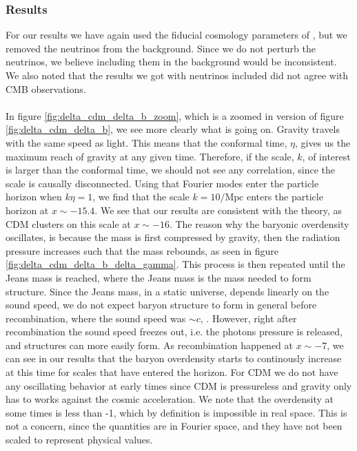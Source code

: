 \documentclass{aa}
\begin{document}
\subsubsection{Results}
For our results we have again used the fiducial cosmology parameters of \cite{winther:2023}, but we removed the neutrinos from the background.
Since we do not perturb the neutrinos, we believe including them in the background would be inconsistent. We also noted that the results we got with neutrinos included
did not agree with CMB observations.\\
\\
In figure \ref{fig:delta_cdm_delta_b_zoom}, which is a zoomed in version of figure \ref{fig:delta_cdm_delta_b}, we see more clearly what is going on. Gravity travels with the same speed as light. This means that the conformal time, $\eta$,
gives us the maximum reach of gravity at any given time. Therefore, if the scale, $k$, of interest is larger than the conformal time, we should not see any correlation,
since the scale is causally disconnected. Using that Fourier modes enter the particle horizon when $k\eta=1$, we find
that the scale $k=10/\mathrm{Mpc}$ enters the particle horizon at $x\sim -15.4$.
We see that our results are consistent with the theory, as CDM clusters on this scale at $x\sim -16$. The reason why the baryonic overdensity oscillates, is because 
the mass is first compressed by gravity, then the radiation pressure increases such that the mass rebounds, as seen in figure \ref{fig:delta_cdm_delta_b_delta_gamma}. This process is then repeated until the Jeans mass is reached, where the Jeans mass is the mass needed to form structure.
Since the Jeans mass, in a static universe, depends linearly on the sound speed, we do not expect baryon structure to form in general before recombination, where the sound speed was $\sim c$, \cite{Shen:2022}. However, right after recombination  
the sound speed freezes out, i.e. the photons pressure is released, and structures can more easily form. As recombination happened at $x\sim -7$, we can see in our results that the baryon overdensity starts to continously increase at this time for scales that have entered the horizon.
For CDM we do not have any oscillating behavior at early times since CDM is pressureless and gravity only has to works against the cosmic acceleration.   
We note that the overdensity at some times is less than -1, which by definition is impossible in real space. This is not a concern, since the quantities are in Fourier space, and they have not been scaled to represent physical values. 
\end{document}
